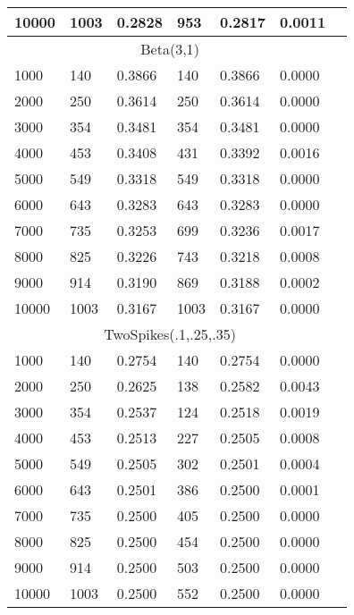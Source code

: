 \begin{center}
\begin{longtable}{lll|llll}
10000 & 1003 & 0.2828 & 953 & 0.2817 & 0.0011 \\
\bottomrule
\multicolumn{6}{c}{Beta(3,1)} & \\
\midrule
1000 & 140 & 0.3866 & 140 & 0.3866 & 0.0000 \\
2000 & 250 & 0.3614 & 250 & 0.3614 & 0.0000 \\
3000 & 354 & 0.3481 & 354 & 0.3481 & 0.0000 \\
4000 & 453 & 0.3408 & 431 & 0.3392 & 0.0016 \\
5000 & 549 & 0.3318 & 549 & 0.3318 & 0.0000 \\
6000 & 643 & 0.3283 & 643 & 0.3283 & 0.0000 \\
7000 & 735 & 0.3253 & 699 & 0.3236 & 0.0017 \\
8000 & 825 & 0.3226 & 743 & 0.3218 & 0.0008 \\
9000 & 914 & 0.3190 & 869 & 0.3188 & 0.0002 \\
10000 & 1003 & 0.3167 & 1003 & 0.3167 & 0.0000 \\
\bottomrule
\multicolumn{6}{c}{TwoSpikes(.1,.25,.35)} & \\
\midrule
1000 & 140 & 0.2754 & 140 & 0.2754 & 0.0000 \\
2000 & 250 & 0.2625 & 138 & 0.2582 & 0.0043 \\
3000 & 354 & 0.2537 & 124 & 0.2518 & 0.0019 \\
4000 & 453 & 0.2513 & 227 & 0.2505 & 0.0008 \\
5000 & 549 & 0.2505 & 302 & 0.2501 & 0.0004 \\
6000 & 643 & 0.2501 & 386 & 0.2500 & 0.0001 \\
7000 & 735 & 0.2500 & 405 & 0.2500 & 0.0000 \\
8000 & 825 & 0.2500 & 454 & 0.2500 & 0.0000 \\
9000 & 914 & 0.2500 & 503 & 0.2500 & 0.0000 \\
10000 & 1003 & 0.2500 & 552 & 0.2500 & 0.0000 \\
\bottomrule
\end{longtable}
\end{center}
